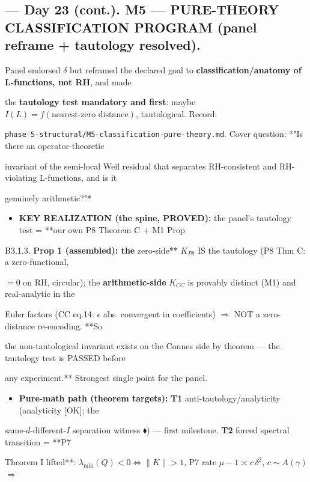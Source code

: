 \documentclass[10pt]{article}
\begin{document}
\subsection*{ --- Day 23 (cont.). M5 --- PURE-THEORY CLASSIFICATION PROGRAM (panel reframe + tautology resolved).}
Panel endorsed \ensuremath{\delta} but reframed the declared goal to \textbf{classification/anatomy of L-functions, not RH}, and made\par
the \textbf{tautology test mandatory and first}: maybe $I(L)=f(\text{nearest-zero distance})$, tautological. Record:\par
\texttt{phase-5-structural/M5-classification-pure-theory.md}. Cover question: *"Is there an operator-theoretic\par
invariant of the semi-local Weil residual that separates RH-consistent and RH-violating L-functions, and is it\par
genuinely arithmetic?"*\par
\begin{itemize}
\item \textbf{KEY REALIZATION (the spine, PROVED):} the panel's tautology test = **our own P8 Theorem C + M1 Prop
\end{itemize}
  B3.1.3.\textbf{ Prop 1 (assembled): the }zero-side** $K_{P8}$ IS the tautology (P8 Thm C: a zero-functional,\par
  $=0$ on RH, circular); the \textbf{arithmetic-side} $K_{CC}$ is provably distinct (M1) and real-analytic in the\par
  Euler factors (CC eq.14: $\epsilon$ abs. convergent in coefficients) \ensuremath{\Rightarrow} NOT a zero-distance re-encoding. **So\par
  the non-tautological invariant exists on the Connes side by theorem --- the tautology test is PASSED before\par
  any experiment.** Strongest single point for the panel.\par
\begin{itemize}
\item \textbf{Pure-math path (theorem targets):} \textbf{T1} anti-tautology/analyticity (analyticity [OK]; the
\end{itemize}
  same-$d$-different-$I$ separation witness $\blacklozenge$) --- first milestone. \textbf{T2} forced spectral transition = **P7\par
  Theorem I lifted**: $\lambda_{\min}(Q)<0\iff\|K\|>1$, P7 rate $\mu-1\asymp c\,\delta^2$, $c\sim A(\gamma)$ \ensuremath{\Rightarrow}\par
\end{document}
